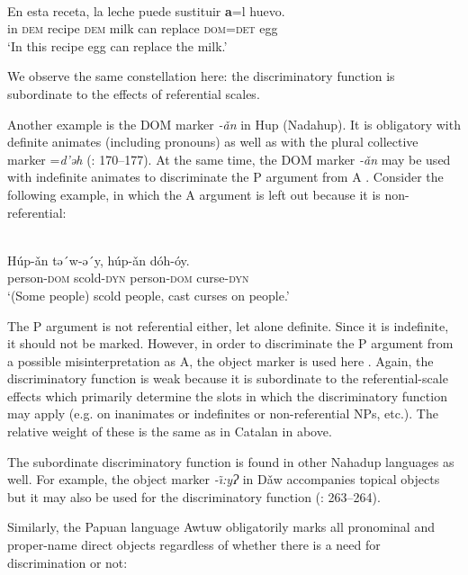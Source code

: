 \documentclass[output=paper]{langsci/langscibook}
\begin{document}
\ea\label{ex:serzant:16}
\\
\gll En esta receta, la   leche   puede   sustituir \textbf{a}=l     huevo.\\
     in  \textsc{dem} recipe \textsc{dem}   milk   can   replace \textsc{dom=det}   egg\\
\glt ‘In this recipe egg can replace the milk.’
\z

We observe the same constellation here: the discriminatory function is subordinate to the effects of referential scales. 

Another example is the DOM marker \textit{{}-ǎn} in Hup (Nadahup). It is obligatory with definite animates (including pronouns) as well as with the plural collective marker =\textit{d’ǝh} (\citealt{Epps2008}: 170–177). At the same time, the DOM marker \textit{{}-ǎn} may be used with indefinite animates to discriminate the P argument from A \citep[95]{Epps2009}. Consider the following example, in which the A argument is left out because it is non-referential: 

\ea\label{ex:serzant:17}
\\
\gll Húp-ǎn   tǝ´w-ǝ´y,   húp-ǎn    dóh-óy.\\
     person-\textsc{dom}  scold-\textsc{dyn}  person-\textsc{dom}  curse-\textsc{dyn}\\
\glt ‘(Some people) scold people, cast curses on people.’
\z

The P argument is not referential either, let alone definite. Since it is indefinite, it should not be marked. However, in order to discriminate the P argument from a possible misinterpretation as A, the object marker is used here \citep[95]{Epps2009}. Again, the discriminatory function is weak because it is subordinate to the referential-scale effects which primarily determine the slots in which the discriminatory function may apply (e.g. on inanimates or indefinites or non-referential NPs, etc.). The relative weight of these is the same as in Catalan in  above. 

The subordinate discriminatory function is found in other Nahadup languages as well. For example, the object marker \textit{{}-\~\i:yɁ} in Dǎw accompanies topical objects but it may also be used for the discriminatory function (\citealt{MartinsMartins1999}: 263–264). 

Similarly, the Papuan language Awtuw obligatorily marks all pronominal and proper-name direct objects regardless of whether there is a need for discrimination or not:
\end{document}
